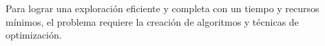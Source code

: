 \documentclass[sigconf]{acmart}
\begin{document}
%
%
%



Para lograr una exploraci\'{o}n eficiente y completa con un tiempo y recursos m\'{i}nimos, el problema requiere la creaci\'{o}n de algoritmos y t\'{e}cnicas de optimizaci\'{o}n.\\


\end{document}
